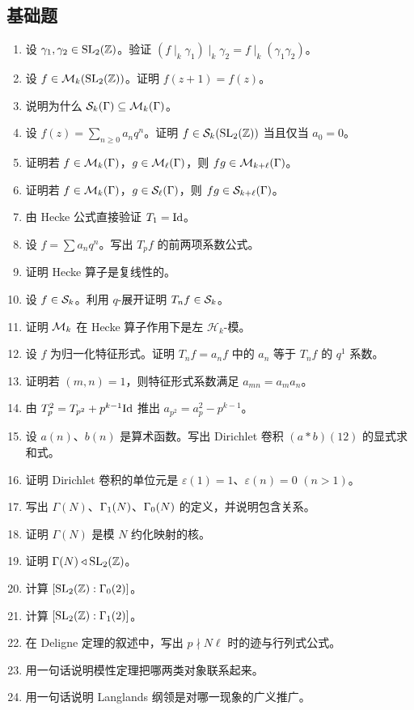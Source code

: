 \subsection*{基础题}
\begin{enumerate}[label=\textbf{\arabic*.}, leftmargin=*, itemsep=0.5em]
\item \basic 设 $\gamma_1,\gamma_2\in \mathrm{SL}_2(\mathbb{Z})$。验证
$(f\mid_k\gamma_1)\mid_k\gamma_2=f\mid_k(\gamma_1\gamma_2)$。
\item \basic 设 $f\in \mathcal{M}_k(\mathrm{SL}_2(\mathbb{Z}))$。证明 $f(z+1)=f(z)$。
\item \basic 说明为什么 $\mathcal{S}_k(\Gamma)\subseteq \mathcal{M}_k(\Gamma)$。
\item \basic 设 $f(z)=\sum_{n\ge 0}a_nq^n$。证明 $f\in \mathcal{S}_k(\mathrm{SL}_2(\mathbb{Z}))$ 当且仅当 $a_0=0$。
\item \basic 证明若 $f\in \mathcal{M}_k(\Gamma)$，$g\in \mathcal{M}_\ell(\Gamma)$，则 $fg\in \mathcal{M}_{k+\ell}(\Gamma)$。
\item \basic 证明若 $f\in \mathcal{M}_k(\Gamma)$，$g\in \mathcal{S}_\ell(\Gamma)$，则 $fg\in \mathcal{S}_{k+\ell}(\Gamma)$。
\item \basic 由 Hecke 公式直接验证 $T_1=\mathrm{Id}$。
\item \basic 设 $f=\sum a_nq^n$。写出 $T_pf$ 的前两项系数公式。
\item \basic 证明 Hecke 算子是复线性的。
\item \basic 设 $f\in \mathcal{S}_k$。利用 $q$-展开证明 $T_nf\in \mathcal{S}_k$。
\item \basic 证明 $\mathcal{M}_k$ 在 Hecke 算子作用下是左 $\mathcal{H}_k$-模。
\item \basic 设 $f$ 为归一化特征形式。证明 $T_nf=a_nf$ 中的 $a_n$ 等于 $T_nf$ 的 $q^1$ 系数。
\item \basic 证明若 $(m,n)=1$，则特征形式系数满足 $a_{mn}=a_ma_n$。
\item \basic 由 $T_p^2=T_{p^2}+p^{k-1}\mathrm{Id}$ 推出
$a_{p^2}=a_p^2-p^{k-1}$。
\item \basic 设 $a(n)$、$b(n)$ 是算术函数。写出 Dirichlet 卷积 $(a*b)(12)$ 的显式求和式。
\item \basic 证明 Dirichlet 卷积的单位元是 $\varepsilon(1)=1$、$\varepsilon(n)=0$ $(n>1)$。
\item \basic 写出 $\Gamma(N)$、$\Gamma_1(N)$、$\Gamma_0(N)$ 的定义，并说明包含关系。
\item \basic 证明 $\Gamma(N)$ 是模 $N$ 约化映射的核。
\item \basic 证明 $\Gamma(N)\triangleleft \mathrm{SL}_2(\mathbb{Z})$。
\item \basic 计算 $[\mathrm{SL}_2(\mathbb{Z}):\Gamma_0(2)]$。
\item \basic 计算 $[\mathrm{SL}_2(\mathbb{Z}):\Gamma_1(2)]$。
\item \basic 在 Deligne 定理的叙述中，写出 $p\nmid N\ell$ 时的迹与行列式公式。
\item \basic 用一句话说明模性定理把哪两类对象联系起来。
\item \basic 用一句话说明 Langlands 纲领是对哪一现象的广义推广。
\end{enumerate}
